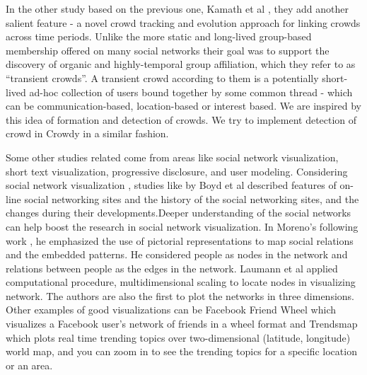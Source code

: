 \documentclass{sig-alternate}
\begin{document}
In the other study based on the previous one, Kamath et al
\cite{krishna:2011}, they add another salient feature - a novel crowd tracking
and evolution approach for linking crowds across time periods. Unlike the more
static and long-lived group-based membership offered on many social networks
their goal was to support the discovery of organic and highly-temporal group
affiliation, which they refer to as ``transient crowds''. A transient crowd
according to them is a potentially short-lived ad-hoc collection of users bound
together by some common thread - which can be communication-based,
location-based or interest based. We are inspired by this idea of formation and
detection of crowds. We try to implement detection of crowd in Crowdy in a
similar fashion.

Some other studies related come from areas like social network visualization,
short text visualization, progressive disclosure, and user modeling. Considering
social network visualization , studies like \cite{Boyd:2008} by Boyd et al described features
of on-line social networking sites and the history of the social networking sites,
and the changes during their developments.Deeper understanding of the social
networks can help boost the research in social network visualization. In Moreno's
following work \cite{Moreno:1953}, he emphasized the use of pictorial representations to map
social relations and the embedded patterns. He considered people as nodes in the
network and relations between people as the edges in the network. Laumann et al
\cite{Laumann:1966} applied computational procedure, multidimensional scaling to locate nodes in
visualizing network. The authors are also the first to plot the networks in three
dimensions. Other examples of good visualizations can be Facebook Friend Wheel
\cite{facebook_wheel} which visualizes a Facebook user's network of friends in a wheel format and
Trendsmap \cite{trends_map} which plots real time trending topics over two-dimensional (latitude,
longitude) world map, and you can zoom in to see the trending topics for a specific
location or an area. 
\end{document}
